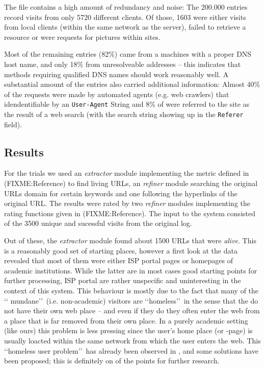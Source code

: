 \documentclass[a4paper]{danarticle}
\begin{document}
      The file contains a high amount of redundancy and noise: The 200.000 
      entries record visits from only 5720 different clients. Of those, 1603 
      were either visits from local clients (within the same network as the 
      server), failed to retrieve a resource or were requests for pictures 
      within sites.
      
      Most of the remaining entries (82\%) came from a machines with a proper
      DNS host name, and only 18\% from unresolveable addresses -- this indicates
      that methods requiring qualified DNS names should work reasonably well. A
      substantial amount of the entries also carried additional information:
      Almost 40\% of the requests were made by automated agents (e.g. web
      crawlers) that idendentifiable by an \verb$User-Agent$ String and 8\% of
      were referred to the site as the result of a web search (with the search
      string showing up in the \verb$Referer$ field).
    \subsection{Results}
      For the trials we used an \textit{extractor} module implementing the
      metric defined in (FIXME:Reference) to find living URLs, an
      \textit{refiner} module searching the original URLs domain for certain
      keywords and one following the hyperlinks of the original URL. The results
      were rated by two \textit{refiner} modules implementing the rating
      functions given in (FIXME:Reference). The input to the system consisted of
      the 3500 unique and sucessful visits from the original log.
      
      Out of these, the \textit{extractor} module found about 1500 URLs that
      were \textit{alive}. This is a reasonably good set of starting places,
      however a first look at the data revealed that most of them were either
      ISP portal pages or homepages of academic institutions. While the latter
      are in most cases good starting points for further processing, ISP portal
      are rather unspecific and uninteresting in the context of this system.
      This behaviour is mostly due to the fact that many of the \lq\lq
      mundane\rq\rq\ (i.e. non-academic) visitors are \lq\lq homeless\rq\rq\ in
      the sense that the do not have their own web place -- and even if they do
      they often enter the web from a place that is far removed from their own
      place. In a purely academic setting (like ours) this problem is less
      pressing since the user's home place (or -page) is usually loacted within
      the same network from which the user enters the web. This \lq\lq homeless
      user problem\rq\rq\ has already been observed in \cite{webaware}, and some
      solutions have been proposed; this is definitely on of the points for
      further research.
      
\end{document}
